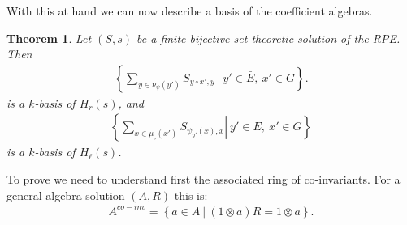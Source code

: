 \documentclass[a4paper,10pt]{amsart}
\newtheorem{theorem}[lemma]{Theorem}
\theoremstyle{definition}
\theoremstyle{remark}
\begin{document}
With this at hand we can now describe a basis of the coefficient algebras.


\begin{theorem}\label{Th basis right coeff}
    Let $(S,s)$ be a finite bijective set-theoretic solution of the RPE. Then
    \begin{align*}
        \left\{\left.\sum_{y\in \nu_{\psi}(y')}S_{y\circ x', y} \ \right|\ y' \in \bar{E},\ x'\in G\right\}.
    \end{align*}
is a $k$-basis of $H_r(s)$, and 
    \begin{align*}
        \left\{\left. \sum_{x\in \mu_{\circ}(x')}S_{\psi_{y'}(x),x} \right|\ y' \in \bar{E},\ x'\in G\right\}
    \end{align*}
is a $k$-basis of $H_{\ell}(s)$.
\end{theorem}


To prove  we need to understand first the associated ring of co-invariants. For a general algebra solution $(A,R)$ this is:
$$A^{co-inv} = \left\{a \in A\ \left|\ (1\otimes a) R = 1\otimes a\right.\right\}.$$
\end{document}
